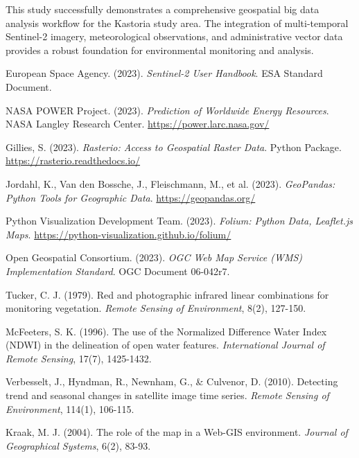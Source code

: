 \documentclass[a4paper,12pt]{article}
\begin{document}
This study successfully demonstrates a comprehensive geospatial big data
analysis workflow for the Kastoria study area. The integration of
multi-temporal Sentinel-2 imagery, meteorological observations, and
administrative vector data provides a robust foundation for environmental
monitoring and analysis.

\begin{thebibliography}{99}

    European Space Agency. (2023). \textit{Sentinel-2 User Handbook}. ESA Standard Document.

    NASA POWER Project. (2023). \textit{Prediction of Worldwide Energy Resources}. NASA Langley Research Center. \url{https://power.larc.nasa.gov/}

    Gillies, S. (2023). \textit{Rasterio: Access to Geospatial Raster Data}. Python Package. \url{https://rasterio.readthedocs.io/}

    Jordahl, K., Van den Bossche, J., Fleischmann, M., et al. (2023). \textit{GeoPandas: Python Tools for Geographic Data}. \url{https://geopandas.org/}

    Python Visualization Development Team. (2023). \textit{Folium: Python Data, Leaflet.js Maps}. \url{https://python-visualization.github.io/folium/}

    Open Geospatial Consortium. (2023). \textit{OGC Web Map Service (WMS) Implementation Standard}. OGC Document 06-042r7.

    Tucker, C. J. (1979). Red and photographic infrared linear combinations for monitoring vegetation. \textit{Remote Sensing of Environment}, 8(2), 127-150.

    McFeeters, S. K. (1996). The use of the Normalized Difference Water Index (NDWI) in the delineation of open water features. \textit{International Journal of Remote Sensing}, 17(7), 1425-1432.

    Verbesselt, J., Hyndman, R., Newnham, G., \& Culvenor, D. (2010). Detecting trend and seasonal changes in satellite image time series. \textit{Remote Sensing of Environment}, 114(1), 106-115.

    Kraak, M. J. (2004). The role of the map in a Web-GIS environment. \textit{Journal of Geographical Systems}, 6(2), 83-93.

\end{thebibliography}
\end{document}
